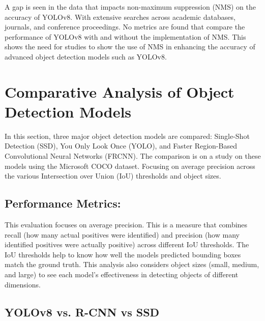\documentclass[11pt,journal,compsoc]{IEEEtran}
\begin{document}
A gap is seen in the data that impacts non-maximum suppression (NMS) on the accuracy of YOLOv8. With extensive searches across academic databases, journals, and conference proceedings. No metrics are found that compare the performance of YOLOv8 with and without the implementation of NMS. This shows the need for studies to show the use of NMS in enhancing the accuracy of advanced object detection models such as YOLOv8.

\section{Comparative Analysis of Object Detection Models}
In this section, three major object detection models are compared: Single-Shot Detection (SSD), You Only Look Once (YOLO), and Faster Region-Based Convolutional Neural Networks (FRCNN). The comparison is on a study\cite{Srivastava2021} on these models using the Microsoft COCO dataset\cite{cocodataset}. Focusing on average precision across the various Intersection over Union (IoU) thresholds and object sizes.

\subsection{Performance Metrics:}
This evaluation focuses on average precision\cite{kili_technology_map}. This is a measure that combines recall (how many actual positives were identified) and precision (how many identified positives were actually positive) across different IoU thresholds. The IoU thresholds help to know how well the models predicted bounding boxes match the ground truth. This analysis also considers object sizes (small, medium, and large) to see each model's effectiveness in detecting objects of different dimensions.

\subsection{YOLOv8 vs. R-CNN vs SSD}

\begin{table}[h]
\centering
\caption{Comparative Performance of Object Detection Models\cite{Srivastava2021}}
\label{tab:object_detection_models}
\end{table}
\end{document}

